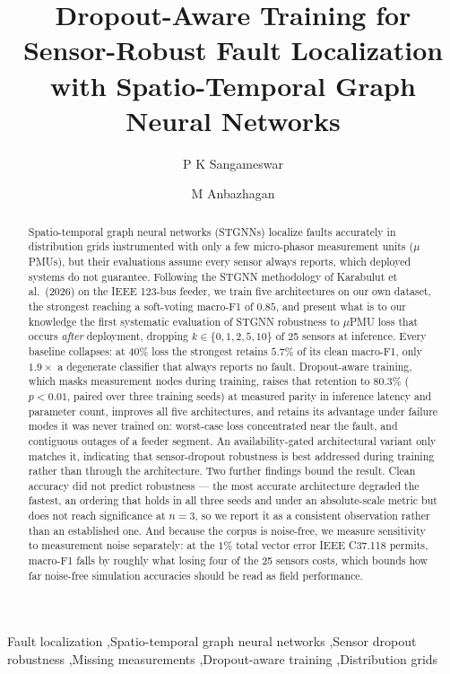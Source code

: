 \documentclass[3p,times,procedia]{elsarticle}
\begin{document}
\begin{frontmatter}


\title{Dropout-Aware Training for Sensor-Robust Fault Localization with Spatio-Temporal Graph Neural Networks}

\author[1]{P K Sangameswar}
\author[1]{M Anbazhagan}

\address[1]{Department of Computer Science and Engineering, Amrita School of Computing, Coimbatore, Amrita Vishwa Vidyapeetham, India}

\begin{abstract}
Spatio-temporal graph neural networks (STGNNs) localize faults accurately in distribution grids instrumented with only a few micro-phasor measurement units ($\mu$PMUs), but their evaluations assume every sensor always reports, which deployed systems do not guarantee. Following the STGNN methodology of Karabulut et al.\ (2026) on the IEEE 123-bus feeder, we train five architectures on our own dataset, the strongest reaching a soft-voting macro-F1 of $0.85$, and present what is to our knowledge the first systematic evaluation of STGNN robustness to $\mu$PMU loss that occurs \emph{after} deployment, dropping $k \in \{0,1,2,5,10\}$ of 25 sensors at inference. Every baseline collapses: at 40\% loss the strongest retains $5.7\%$ of its clean macro-F1, only $1.9\times$ a degenerate classifier that always reports no fault. Dropout-aware training, which masks measurement nodes during training, raises that retention to $80.3\%$ ($p<0.01$, paired over three training seeds) at measured parity in inference latency and parameter count, improves all five architectures, and retains its advantage under failure modes it was never trained on: worst-case loss concentrated near the fault, and contiguous outages of a feeder segment. An availability-gated architectural variant only matches it, indicating that sensor-dropout robustness is best addressed during training rather than through the architecture. Two further findings bound the result. Clean accuracy did not predict robustness --- the most accurate architecture degraded the fastest, an ordering that holds in all three seeds and under an absolute-scale metric but does not reach significance at $n=3$, so we report it as a consistent observation rather than an established one. And because the corpus is noise-free, we measure sensitivity to measurement noise separately: at the $1\%$ total vector error IEEE C37.118 permits, macro-F1 falls by roughly what losing four of the 25 sensors costs, which bounds how far noise-free simulation accuracies should be read as field performance.
\end{abstract}

\begin{keyword}
Fault localization \sep Spatio-temporal graph neural networks \sep Sensor dropout robustness \sep Missing measurements \sep Dropout-aware training \sep Distribution grids
\end{keyword}

\end{frontmatter}
\end{document}

